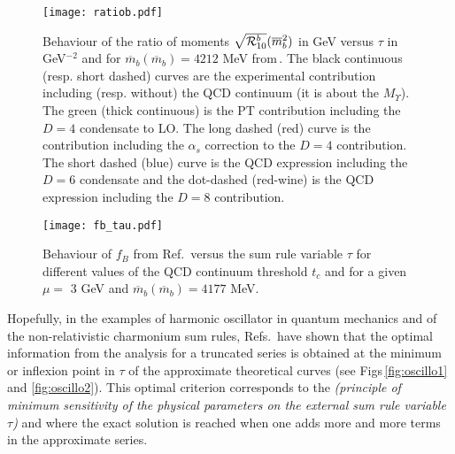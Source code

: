 \documentclass[aps,prd,groupedaddress,nofootinbib]{revtex4-1}
\def\nin{\noindent}
\begin{document}
\begin{figure}[H]
\begin{center}
\texttt{[image: ratiob.pdf]}
\caption{\normalsize  Behaviour of the ratio of moments $\sqrt{{\cal R}^b_{10}}(\overline{m}_b^2)$ in GeV versus $\tau$ in GeV$^{-2}$ and for $\overline{m}_b(\overline{m}_b) = 4212$ MeV from\,\cite{SNH12}. The black continuous (resp. short dashed) curves are the experimental contribution including (resp. without) the QCD continuum (it is about the $M_{\Upsilon}$). The green (thick continuous) is the PT contribution including the $D=4$ condensate to LO. The long dashed (red) curve is the contribution including the $\alpha_s$ correction to the $D=4$ contribution. The short dashed (blue) curve is the QCD expression including the $D=6$ condensate and the dot-dashed (red-wine) is the QCD expression including the $D=8$ contribution. } 
\label{fig:ratiob}
\end{center}
\vspace*{-0.5cm}
\end{figure} 
\nin
\begin{center}
{\begin{figure}[hbt]
\begin{center}
{\texttt{[image: fb\_tau.pdf]}}
\end{center}
\caption{\normalsize Behaviour of $f_B$ from Ref.\,\cite{SNFB12} versus the sum rule variable $\tau$ for different values of the QCD continuum threshold $t_c$ and for a given $\mu=$ 3 GeV and $\overline{m}_b(\overline{m}_b) = 4177$ MeV.}
\label{fig:fb}
\end{figure}}
\end{center}
Hopefully, in the examples of harmonic oscillator in quantum mechanics and of the non-relativistic charmonium sum rules, Refs.\,\cite{BELLa,BERTa} have shown that the optimal information 
from the analysis for a truncated series is obtained at the minimum or inflexion point in $\tau$ of the approximate theoretical curves (see Figs\,\ref{fig:oscillo1} and \ref{fig:oscillo2}). This optimal criterion corresponds  to the {\it (principle of minimum sensitivity of the physical parameters on the external sum rule variable $\tau$)} and where the exact solution is reached when one adds more and more terms in the approximate series.  
\end{document}
